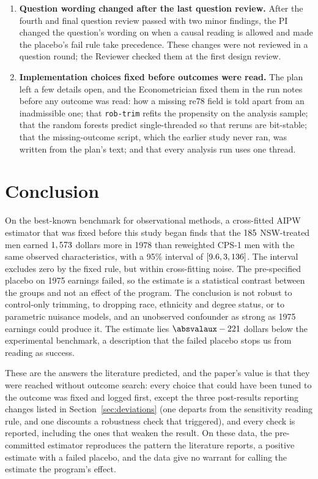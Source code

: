 \documentclass[11pt]{article}
\def\absvalaux-#1\relax{#1}
\newcommand{\absval}[1]{\expandafter\absvalaux#1\relax}
\newcommand{\run}[1]{\texttt{#1}}
\newcommand{\ci}[2]{$[#1, #2]$}
\begin{document}
\begin{enumerate}
  \item \textbf{Question wording changed after the last question review.} After the fourth
        and final question review passed with two minor findings, the PI changed the question's
        wording on when a causal reading is allowed and made the placebo's fail rule take
        precedence. These changes were not reviewed in a question round; the Reviewer checked
        them at the first design review.
  \item \textbf{Implementation choices fixed before outcomes were read.} The plan left a few
        details open, and the Econometrician fixed them in the run notes before any outcome
        was read: how a missing re78 field is told apart from an inadmissible one; that
        \run{rob-trim} refits the propensity on the analysis sample; that the random forests
        predict single-threaded so that reruns are bit-stable; that the missing-outcome
        script, which the earlier study never ran, was written from the plan's text; and that
        every analysis run uses one thread.
\end{enumerate}

\section{Conclusion}

On the best-known benchmark for observational methods, a cross-fitted AIPW estimator that
was fixed before this study began finds that the $185$ NSW-treated men earned
$1,573$ dollars more in 1978 than reweighted CPS-1 men with the same observed
characteristics, with a 95\% interval of \ci{\PrimaryCiLow}{\PrimaryCiHigh}. The interval
excludes zero by the fixed rule, but within cross-fitting noise. The pre-specified placebo
on 1975 earnings failed, so the estimate is a statistical contrast between the groups and
not an effect of the program. The conclusion is not robust to control-only trimming, to
dropping race, ethnicity and degree status, or to parametric nuisance models, and an
unobserved confounder as strong as 1975 earnings could produce it. The estimate lies
$\absval{\HTwoDiff}$ dollars below the experimental benchmark, a description that the
failed placebo stops us from reading as success.

These are the answers the literature predicted, and the paper's value is that they were
reached without outcome search: every choice that could have been tuned to the outcome was
fixed and logged first, except the three post-results reporting changes listed in
Section~\ref{sec:deviations} (one departs from the sensitivity reading rule, and one
discounts a robustness check that triggered), and every check
is reported, including the ones that weaken the result. On these data, the pre-committed estimator reproduces the pattern the literature
reports, a positive estimate with a failed placebo, and the data give no warrant for calling
the estimate the program's effect.

\FloatBarrier




\end{document}
